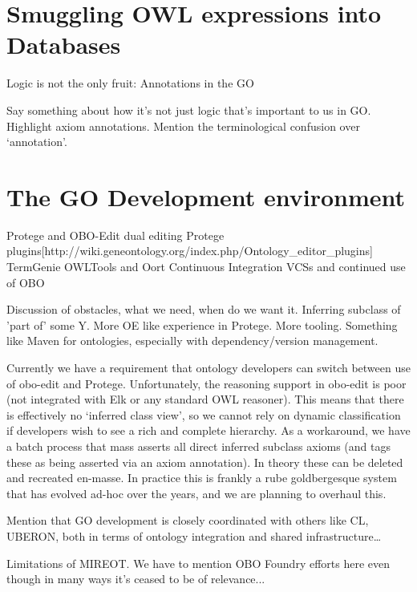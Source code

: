 \documentclass{llncs}
\begin{document}
\section{Smuggling OWL expressions into Databases}


\cite{Huntley2014}
Logic is not the only fruit: Annotations in the GO

Say something about how it’s not just logic that’s important to us in GO. Highlight axiom annotations.
Mention the terminological confusion over ‘annotation’.

\section{The GO Development environment}



Protege and OBO-Edit\cite{Day-Richter2007} dual editing
Protege plugins[http://wiki.geneontology.org/index.php/Ontology\_editor\_plugins]
TermGenie\cite{Dietze2014}
OWLTools and Oort
Continuous Integration\cite{Mungall2012a}
VCSs and continued use of OBO

Discussion of obstacles, what we need, when do we want it. Inferring subclass of 'part of' some Y. More OE like experience in Protege. More tooling. Something like Maven for ontologies, especially with dependency/version management.

Currently we have a requirement that ontology developers can switch between use of obo-edit and Protege. Unfortunately, the reasoning support in obo-edit is poor (not integrated with Elk or any standard OWL reasoner). This means that there is effectively no ‘inferred class view’, so we cannot rely on dynamic classification if developers wish to see a rich and complete hierarchy. As a workaround, we have a batch process that mass asserts all direct inferred subclass axioms (and tags these as being asserted via an axiom annotation). In theory these can be deleted and recreated en-masse. In practice this is frankly a rube goldbergesque system that has evolved ad-hoc over the years, and we are planning to overhaul this.

Mention that GO development is closely coordinated with others like CL, UBERON, both in terms of ontology integration and shared infrastructure…

Limitations of MIREOT. We have to mention OBO Foundry efforts here even though in many ways it’s ceased to be of relevance...
\end{document}
